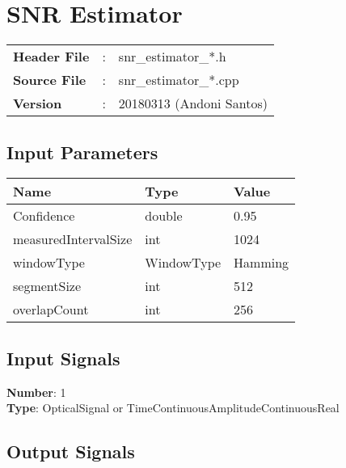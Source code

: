 \clearpage

\section{SNR Estimator}

\begin{refsection}

\begin{tcolorbox}	
	\begin{tabular}{p{2.75cm} p{0.2cm} p{10.5cm}} 	
		\textbf{Header File}   &:& snr\_estimator\_*.h \\
		\textbf{Source File}   &:& snr\_estimator\_*.cpp \\
		\textbf{Version}	   &:& 20180313 (Andoni Santos)
	\end{tabular}
\end{tcolorbox}

\subsection*{Input Parameters}

\begin{table}[H]
	\centering
	\begin{tabular}{|l|l|l|}
		\hline
		\textbf{Name}  		 & \textbf{Type}  & \textbf{Value}    	\\\hline
		Confidence     		 & double         & 0.95              	\\\hline
		measuredIntervalSize & int 			  & 1024				\\\hline
		windowType			 & WindowType     & Hamming			  	\\\hline
		segmentSize			 & int			  & 512					\\\hline
		overlapCount  		 & int			  & 256					\\\hline
	\end{tabular}
\end{table}

\subsection*{Input Signals}

\textbf{Number}: 1\\
\textbf{Type}: OpticalSignal or TimeContinuousAmplitudeContinuousReal

\subsection*{Output Signals}


\end{refsection}
